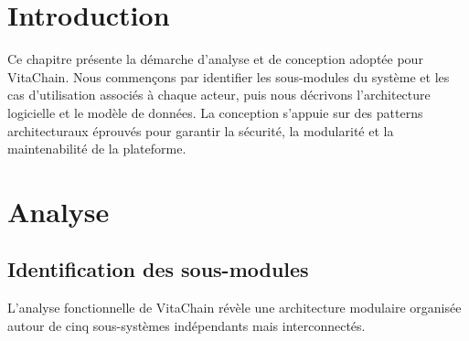 \documentclass[12pt,a4paper]{report}
\begin{document}
\section{Introduction}

Ce chapitre présente la démarche d'analyse et de conception adoptée pour VitaChain.
Nous commençons par identifier les sous-modules du système et les cas d'utilisation
associés à chaque acteur, puis nous décrivons l'architecture logicielle et le modèle
de données. La conception s'appuie sur des patterns architecturaux éprouvés pour
garantir la sécurité, la modularité et la maintenabilité de la plateforme.

\section{Analyse}

\subsection{Identification des sous-modules}

L'analyse fonctionnelle de VitaChain révèle une architecture modulaire organisée autour
de cinq sous-systèmes indépendants mais interconnectés.
\end{document}
